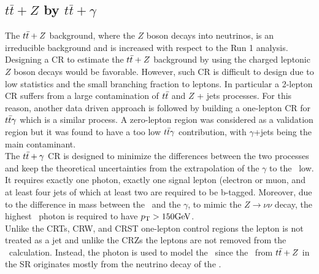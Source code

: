 \subsection{\boldmath$t\bar{t}+Z$ by \boldmath$t\bar{t}+\gamma$}

The $t\bar{t}+Z$ background, where the $Z$ boson decays into neutrinos, is an irreducible background and is increased with respect to the Run 1 analysis. Designing a CR to estimate the $t\bar{t}+Z$ background by using the charged leptonic $Z$ boson decays would be favorable. However, such CR is difficult to design due to low statistics and the small branching fraction to leptons. In particular a 2-lepton CR suffers from a large contamination of $t\bar{t}$ and $Z$ + jets processes. For this reason, another data driven approach is followed by building a one-lepton CR for $t\bar{t}\gamma$ which is a similar process. A zero-lepton region was considered as a validation region but it was found to have a too low $t\bar{t}\gamma$ contribution, with $\gamma$+jets being the main contaminant.\\


The $t\bar{t}+\gamma$ CR is designed to minimize the differences between the two processes and keep the theoretical uncertainties from the extrapolation of the $\gamma$ to the \Zboson\ low.  It requires exactly one photon, exactly one signal lepton (electron or muon, and at least four jets of which at least two are required to be b-tagged. Moreover, due to the difference in mass between the \Zboson\ and the $\gamma$, to mimic the $Z \rightarrow \nu\nu$ decay, the highest \pT\ photon is required to have $\pt>150\gev$.  \\

Unlike the CRTs, CRW, and CRST one-lepton control regions the lepton is not treated as a jet and unlike the CRZs the leptons are not removed from the \met\ calculation. Instead, the photon is used to model the \met\ since the \met\ from $t\bar{t}+Z$ in the SR originates mostly from the neutrino decay of the \Zboson. 

